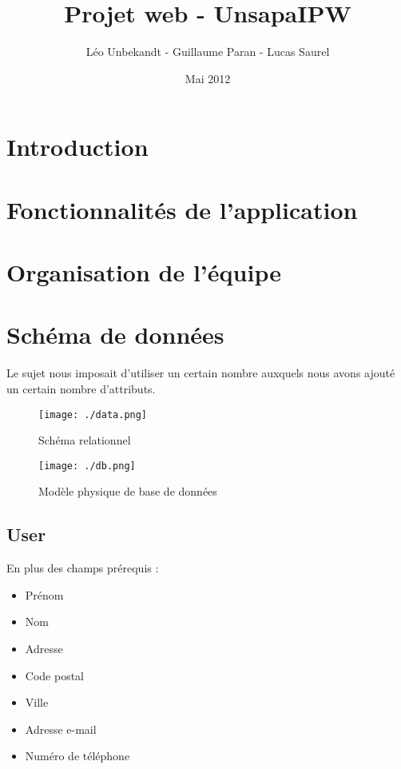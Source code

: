 \documentclass{report}
\author{Léo Unbekandt - Guillaume Paran - Lucas Saurel}
\date{Mai 2012}
\title{Projet web - UnsapaIPW}
\begin{document}
  \maketitle
  \tableofcontents

  \section*{Introduction}

  \section{Fonctionnalités de l'application}
  \section{Organisation de l'équipe}
  \section{Schéma de données}
    Le sujet nous imposait d'utiliser un certain nombre
    auxquels nous avons ajouté un certain nombre d'attributs.

    \begin{figure}
      \caption{Schéma relationnel}
      \texttt{[image: ./data.png]}
    \end{figure}

    \begin{figure}
      \caption{Modèle physique de base de données}
      \texttt{[image: ./db.png]}
    \end{figure}

    \subsection{User}
      En plus des champs prérequis :
      \begin{itemize}
        \item{Prénom}
        \item{Nom}
        \item{Adresse}
        \item{Code postal}
        \item{Ville}
        \item{Adresse e-mail}
        \item{Numéro de téléphone}
      \end{itemize}
\end{document}
